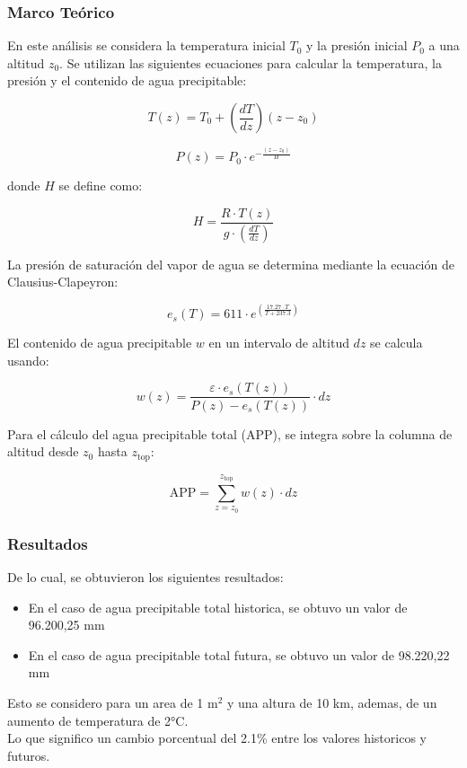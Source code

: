 \documentclass{article}  %
\begin{document}
\subsubsection{Marco Teórico}

En este análisis se considera la temperatura inicial $T_0$ y la presión inicial $P_0$ a una altitud $z_0$. Se utilizan las siguientes ecuaciones para calcular la temperatura, la presión y el contenido de agua precipitable:

\begin{equation}
T(z) = T_0 + \left( \frac{dT}{dz} \right) (z - z_0)
\end{equation}

\begin{equation}
P(z) = P_0 \cdot e^{-\frac{(z - z_0)}{H}}
\end{equation}

donde $H$ se define como:

\begin{equation}
H = \frac{R \cdot T(z)}{g \cdot \left( \frac{dT}{dz} \right)}
\end{equation}

La presión de saturación del vapor de agua se determina mediante la ecuación de Clausius-Clapeyron:

\begin{equation}
e_s(T) = 611 \cdot e^{\left(\frac{17.27 \cdot T}{T + 237.3}\right)}
\end{equation}

El contenido de agua precipitable $w$ en un intervalo de altitud $dz$ se calcula usando:

\begin{equation}
w(z) = \frac{\varepsilon \cdot e_s(T(z))}{P(z) - e_s(T(z))} \cdot dz
\end{equation}

Para el cálculo del agua precipitable total (APP), se integra sobre la columna de altitud desde $z_0$ hasta $z_{\text{top}}$:

\begin{equation}
\text{APP} = \sum_{z=z_0}^{z_{\text{top}}} w(z) \cdot dz
\end{equation}

\subsubsection{Resultados}
De lo cual, se obtuvieron los siguientes resultados:

\begin{itemize}
    \item En el caso de agua precipitable total historica, se obtuvo un valor de 96.200,25 mm 
    \item En el caso de agua precipitable total futura, se obtuvo un valor de 98.220,22 mm
\end{itemize}
Esto se considero para un area de 1 m$^2$ y una altura de 10 km, ademas, de un aumento de temperatura de 2°C. \\
Lo que significo un cambio porcentual del 2.1\% entre los valores historicos y futuros.
\end{document}
